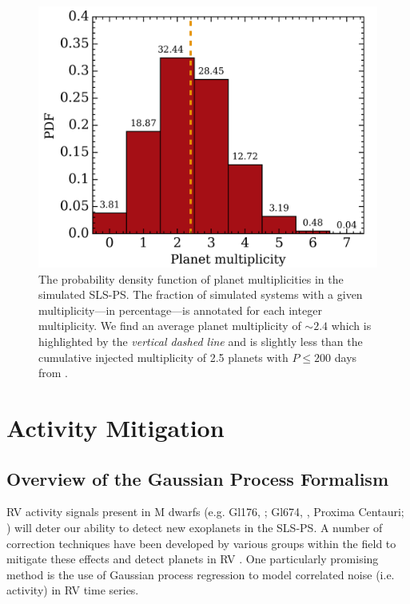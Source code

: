 \begin{figure}
  \centering
  \includegraphics[width=0.6\hsize]{figures/multhist.png}%
  \caption[Histogram of planetary system multiplicities in the simulated SLS-PS.]
      {\small The probability density function of planet multiplicities in the simulated SLS-PS.
    The fraction of simulated systems with a given multiplicity---in percentage---is annotated for
    each integer multiplicity. We find an average planet multiplicity of $\sim 2.4$ which is highlighted by the
    \emph{vertical dashed line} and is slightly less than the cumulative injected multiplicity of 2.5 planets
    with $P\leq 200$ days from \cite{dressing15a}.}
  \label{BSfig:mult}
\end{figure}


\section{Activity Mitigation} \label{BSsect:GP}
\subsection{Overview of the Gaussian Process Formalism}
RV activity signals present in M dwarfs (e.g. Gl176, \citealt{forveille09}; Gl674, \citealt{bonfils07},
Proxima Centauri; \citealt{robertson16}) will deter our ability to detect new exoplanets in the SLS-PS.
A number of correction techniques have been developed by various groups
within the field to mitigate these effects and detect planets in RV \citep[see reviews in][]{fischer16, dumusque17}.
One particularly promising method is the use of Gaussian process regression to model correlated noise (i.e. activity)
in RV time series. \\

